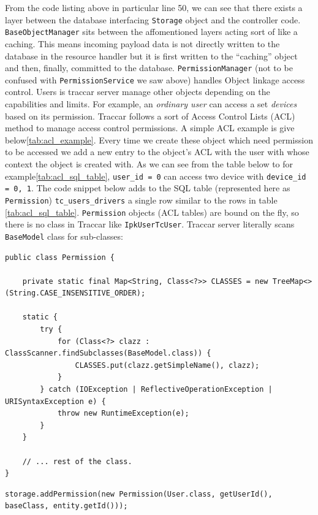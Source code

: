 \documentclass[a4paper]{article}
\begin{document}
From the code listing above in particular line 50, we can see that there exists a layer between the database interfacing 
\lstinline{Storage} object and the controller code. \lstinline{BaseObjectManager} sits between the affomentioned layers acting 
sort of like a caching. This means incoming payload data is not directly written to the database in the resource handler but 
it is first written to the ``caching'' object and then, finally, committed to the database. \lstinline{PermissionManager} (not
to be confused with \lstinline{PermissionService} we saw above) handles Object linkage access control. Users is traccar server
manage other objects depending on the capabilities and limits. For example, an \emph{ordinary user} can access a set \emph{devices}
based on its permission. Traccar follows a sort of Access Control Lists (ACL) method to manage access control permissions. A simple 
ACL example is give below\ref*{tab:acl_example}. Every time we create these object which need permission to be accessed we add a new
entry to the object's ACL with the user with whose context the object is created with. As we can see from the table below to for 
example\ref*{tab:acl_sql_table}, \lstinline{user_id = 0} can access two device with \lstinline{device_id = 0, 1}. The code snippet
below adds to the SQL table (represented here as \lstinline{Permission}) \lstinline{tc_users_drivers} a single row similar to 
the rows in table \ref*{tab:acl_sql_table}. \lstinline{Permission} objects (ACL tables) are bound on the fly, so there is no class
in Traccar like \lstinline{IpkUserTcUser}. Traccar server literally scans \lstinline{BaseModel} class for sub-classes:

\begin{verbatim}
public class Permission {

    private static final Map<String, Class<?>> CLASSES = new TreeMap<>(String.CASE_INSENSITIVE_ORDER);

    static {
        try {
            for (Class<?> clazz : ClassScanner.findSubclasses(BaseModel.class)) {
                CLASSES.put(clazz.getSimpleName(), clazz);
            }
        } catch (IOException | ReflectiveOperationException | URISyntaxException e) {
            throw new RuntimeException(e);
        }
    }

    // ... rest of the class.
}
\end{verbatim}


\begin{verbatim}
storage.addPermission(new Permission(User.class, getUserId(), baseClass, entity.getId()));
\end{verbatim}
\end{document}

